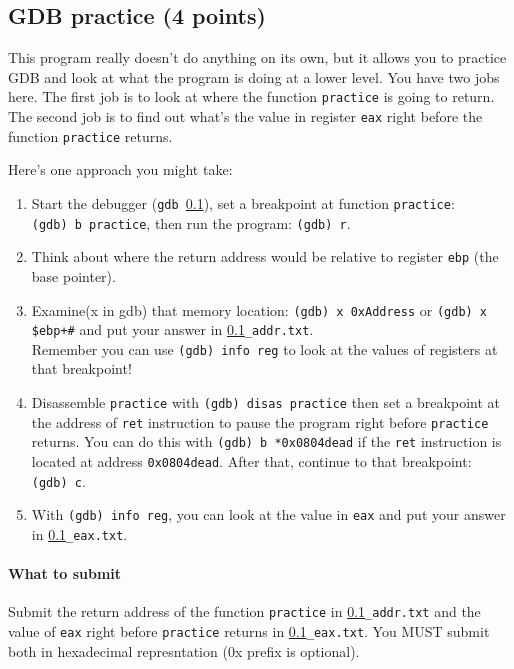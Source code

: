\documentclass[letterpaper,12pt]{report}
\begin{document}
{\smallskip

\subsection{GDB practice (4 points) }
\label{sec:gdb_practice}
This program really doesn't do anything on its own, but it allows you to practice GDB and look at what the program is doing at a lower level. You have two jobs here. The first job is to look at where the function \texttt{practice} is going to return. The second job is to find out what's the value in register \texttt{eax} right before the function \texttt{practice} returns.

\smallskip

Here's one approach you might take:
\begin{enumerate}
\item Start the debugger (\texttt{gdb \ref{sec:gdb_practice}}), set a breakpoint at function \texttt{practice}:\\ \texttt{(gdb) b practice}, then run the program: \texttt{(gdb) r}.
\item Think about where the return address would be relative to register \texttt{ebp} (the base pointer).
\item Examine(x in gdb) that memory location: \texttt{(gdb) x 0xAddress} or \texttt{(gdb) x \$ebp+\#} and put your answer in \texttt{\ref{sec:gdb_practice}\_addr.txt}. \\
Remember you can use \texttt{(gdb) info reg} to look at the values of registers at that breakpoint!
\item Disassemble \texttt{practice} with \texttt{(gdb) disas practice} then set a breakpoint at the address of \texttt{ret} instruction to pause the program right before \texttt{practice} returns. You can do this with \texttt{(gdb) b *0x0804dead} if the \texttt{ret} instruction is located at address \texttt{0x0804dead}. After that, continue to that breakpoint: \texttt{(gdb) c}.
\item With \texttt{(gdb) info reg}, you can look at the value in \texttt{eax} and put your answer in \texttt{\ref{sec:gdb_practice}\_eax.txt}.
\end{enumerate}

\paragraph{What to submit}
Submit the return address of the function \texttt{practice} in \texttt{\ref{sec:gdb_practice}\_addr.txt} and the value of \texttt{eax} right before \texttt{practice} returns in \texttt{\ref{sec:gdb_practice}\_eax.txt}. You MUST submit both in hexadecimal represntation (0x prefix is optional). 

}
\end{document}
